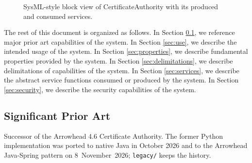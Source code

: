\documentclass[a4paper]{arrowhead}
\begin{document}
\begin{figure}[ht!]
  \centering
  \caption{SysML-style block view of CertificateAuthority with its produced and consumed services.}
  \label{fig:system}
\end{figure}

The rest of this document is organized as follows.
In Section \ref{sec:prior_art}, we reference major prior art capabilities of the system.
In Section \ref{sec:use}, we describe the intended usage of the system.
In Section \ref{sec:properties}, we describe fundamental properties provided by the system.
In Section \ref{sec:delimitations}, we describe delimitations of capabilities of the system.
In Section \ref{sec:services}, we describe the abstract service functions consumed or produced by the system.
In Section \ref{sec:security}, we describe the security capabilities of the system.

\newpage

\subsection{Significant Prior Art}
\label{sec:prior_art}

Successor of the Arrowhead 4.6 Certificate Authority. The former Python implementation was ported to native Java in October 2026 and to the Arrowhead Java-Spring pattern on 8~November~2026; \texttt{legacy/} keeps the history.
\end{document}
